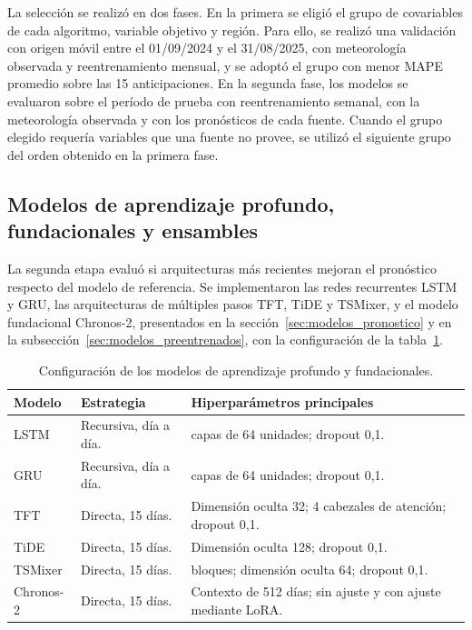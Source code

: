 La selección se realizó en dos fases. En la primera se eligió el grupo de covariables de cada algoritmo, variable objetivo y región. Para ello, se realizó una validación con origen móvil entre el 01/09/2024 y el 31/08/2025, con meteorología observada y reentrenamiento mensual, y se adoptó el grupo con menor MAPE promedio sobre las 15 anticipaciones. En la segunda fase, los modelos se evaluaron sobre el período de prueba con reentrenamiento semanal, con la meteorología observada y con los pronósticos de cada fuente. Cuando el grupo elegido requería variables que una fuente no provee, se utilizó el siguiente grupo del orden obtenido en la primera fase.

\subsection{Modelos de aprendizaje profundo, fundacionales y ensambles}
\label{subsec:modelos_profundos}

La segunda etapa evaluó si arquitecturas más recientes mejoran el pronóstico respecto del modelo de referencia. Se implementaron las redes recurrentes LSTM y GRU, las arquitecturas de múltiples pasos TFT, TiDE y TSMixer, y el modelo fundacional Chronos-2, presentados en la sección~\ref{sec:modelos_pronostico} y en la subsección~\ref{sec:modelos_preentrenados}, con la configuración de la tabla~\ref{tab:modelos_profundos}.

\begin{table}[htbp]
	\centering
	\caption{Configuración de los modelos de aprendizaje profundo y fundacionales.}
	\label{tab:modelos_profundos}
	\footnotesize
	\setlength{\tabcolsep}{4pt}
	\renewcommand{\arraystretch}{1.15}
	\begin{tabularx}{\textwidth}{
			@{}
			>{\raggedright\arraybackslash\hsize=0.7\hsize}X
			>{\raggedright\arraybackslash\hsize=0.9\hsize}X
			>{\raggedright\arraybackslash\hsize=1.4\hsize}X
			@{}
		}
		\toprule
		\textbf{Modelo} & \textbf{Estrategia} & \textbf{Hiperparámetros principales} \\
		\midrule
		LSTM & Recursiva, día a día. & 2 capas de 64 unidades; dropout 0,1. \\
		GRU & Recursiva, día a día. & 2 capas de 64 unidades; dropout 0,1. \\
		TFT & Directa, 15 días. & Dimensión oculta 32; 4 cabezales de atención; dropout 0,1. \\
		TiDE & Directa, 15 días. & Dimensión oculta 128; dropout 0,1. \\
		TSMixer & Directa, 15 días. & 2 bloques; dimensión oculta 64; dropout 0,1. \\
		Chronos-2 & Directa, 15 días. & Contexto de 512 días; sin ajuste y con ajuste mediante LoRA. \\
		\bottomrule
	\end{tabularx}
\end{table}

